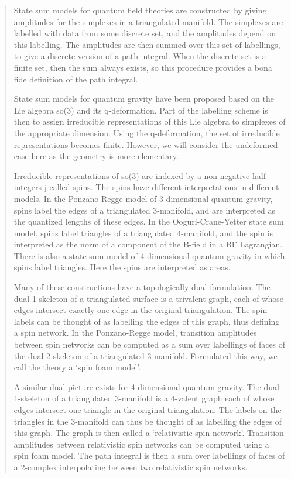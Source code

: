 \begin{quote}
State sum models for quantum field theories are constructed by giving
amplitudes for the simplexes in a triangulated manifold. The simplexes
are labelled with data from some discrete set, and the amplitudes depend
on this labelling.  The amplitudes are then summed over this set of
labellings, to give a discrete version of a path integral. When the
discrete set is a finite set, then the sum always exists, so this
procedure provides a bona fide definition of the path integral.

State sum models for quantum gravity have been proposed based on the Lie
algebra so(3) and its q-deformation.  Part of the labelling scheme
is then to assign irreducible representations of this Lie algebra to
simplexes of the appropriate dimension.  Using the q-deformation, the
set of irreducible representations becomes finite.  However, we will
consider the undeformed case here as the geometry is more elementary.

Irreducible representations of so(3) are indexed by a non-negative
half-integers j called spins.  The spins have different interpretations
in different models.  In the Ponzano-Regge model of 3-dimensional
quantum gravity, spins label the edges of a triangulated 3-manifold, and
are interpreted as the quantized lengths of these edges.  In the
Ooguri-Crane-Yetter state sum model,  spins label triangles of a
triangulated 4-manifold, and the spin is interpreted as the norm of a
component of the B-field in a BF  Lagrangian.  There is also a state sum
model of 4-dimensional quantum gravity in which spins label triangles. 
Here the spins are interpreted as areas.  

Many of these constructions have a topologically dual formulation.  The
dual 1-skeleton of a triangulated surface is a trivalent graph, each of
whose edges intersect exactly one edge in the original triangulation. 
The spin labels can be thought of as labelling the edges of this graph, 
thus defining a spin network.  In the Ponzano-Regge model, transition
amplitudes between spin networks can be computed as a sum over
labellings of faces of the dual 2-skeleton of a triangulated 3-manifold.
Formulated this way, we call the theory a `spin foam model'.

A similar dual picture exists for 4-dimensional quantum gravity.  The
dual 1-skeleton of a triangulated 3-manifold is a 4-valent graph each of
whose edges intersect one triangle in the original triangulation.  The
labels on the triangles in the 3-manifold can thus be thought of as
labelling the edges of this graph.  The graph is then called a
`relativistic spin network'.  Transition amplitudes between relativistic
spin networks can be computed using a spin foam model.  The path
integral is then a sum over labellings of faces of a 2-complex
interpolating between two relativistic spin networks.


\end{quote}
